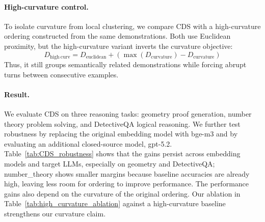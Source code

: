\documentclass{llmxive}
\begin{document}
\paragraph{High-curvature control.}
To isolate curvature from local clustering, we compare CDS with a high-curvature ordering constructed from the same demonstrations.
Both use Euclidean proximity, but the high-curvature variant inverts the curvature objective:
$$D_{\mathrm{high\ curv}} = D_{\mathrm{euclidean}} + \left(\max(D_{\mathrm{curvature}})-D_{\mathrm{curvature}}\right)$$
Thus, it still groups semantically related demonstrations while forcing abrupt turns between consecutive examples.



\paragraph{Result.} We evaluate CDS on three reasoning tasks: geometry proof generation, number theory problem solving, and DetectiveQA logical reasoning.
We further test robustness by replacing the original embedding model with bge-m3 and by evaluating an additional closed-source model, gpt-5.2.
Table~\ref{tab:CDS_robustness} shows that the gains persist across embedding models and target LLMs, especially on geometry and DetectiveQA; number\_theory shows smaller margins because baseline accuracies are already high, leaving less room for ordering to improve performance.
The performance gains also depend on the curvature of the original ordering. Our ablation in Table~\ref{tab:high_curvature_ablation} against a high-curvature baseline strengthens our curvature claim.
\end{document}

